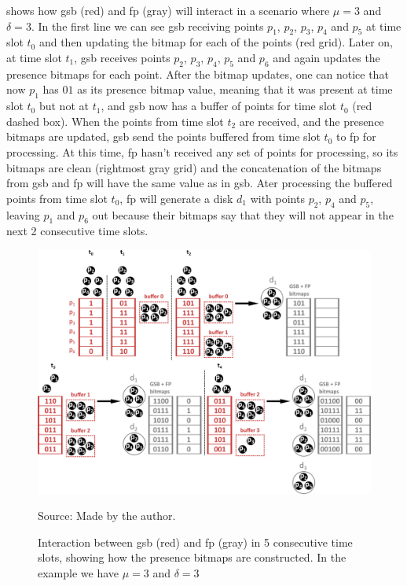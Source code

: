  shows how \ac{gsb} (red) and \ac{fp} (gray) will interact in a scenario where $\mu = 3$ and
$\delta = 3$.  In the first line we can see \ac{gsb} receiving points $p_1$, $p_2$, $p_3$, $p_4$ and $p_5$ at time slot
$t_0$ and then updating the bitmap for each of the points (red grid). Later on, at time slot $t_1$, \ac{gsb} receives
points $p_2$, $p_3$, $p_4$, $p_5$ and $p_6$ and again updates the presence bitmaps for each point. After the bitmap
updates, one can notice that now $p_1$ has $01$ as its presence bitmap value, meaning that it was present at time slot
$t_0$ but not at $t_1$, and \ac{gsb} now has a buffer of points for time slot $t_0$ (red dashed box). When the points
from time slot $t_2$ are received, and the presence bitmaps are updated, \ac{gsb} send the points buffered from time
slot $t_0$ to \ac{fp} for processing.  At this time, \ac{fp} hasn't received any set of points for processing, so its
bitmaps are clean (rightmost gray grid) and the concatenation of the bitmaps from \ac{gsb} and \ac{fp} will have the
same value as in \ac{gsb}. Ater processing the buffered points from time slot $t_0$, \ac{fp} will generate a disk $d_1$
with points $p_2$, $p_4$ and $p_5$, leaving $p_1$ and $p_6$ out because their bitmaps say that they will not appear in
the next 2 consecutive time slots.

\begin{figure}[h!]
    \centering
    \caption{Interaction between \ac{gsb} (red) and \ac{fp} (gray) in 5 consecutive time slots, showing how the presence
        bitmaps are constructed. In the example we have $\mu = 3$ and $\delta = 3$}
    \centerline{\includegraphics[width=\linewidth]{images/gsb_fp_flow.png}}
    \footnotesize{Source: Made by the author.}
    \label{fig:gsb_fp_flow}
\end{figure}

